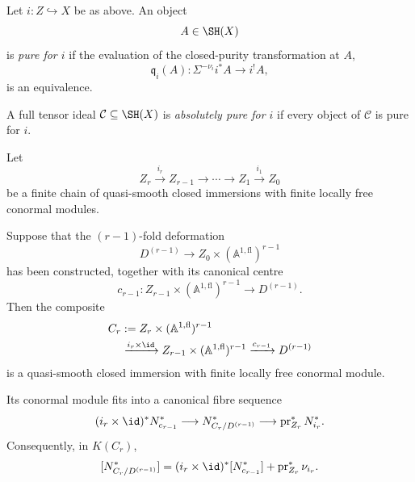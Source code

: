 \begin{definition}
\label{def:i-pure-object}
Let \(i:Z\hookrightarrow X\) be as above.  An object
\[
    A\in\SH(X)
\]
is \emph{pure for \(i\)} if the evaluation of the closed-purity
transformation at \(A\),
\[
    \mathfrak q_i(A):
    \Sigma^{-\nu_i}i^*A
    \longrightarrow
    i^!A,
\]
is an equivalence.

A full tensor ideal \(\mathcal C\subseteq\SH(X)\) is \emph{absolutely pure
for \(i\)} if every object of \(\mathcal C\) is pure for \(i\).
\end{definition}

\begin{lemma}
\label{lem:iterated-deformation-centres}
Let
\[
    Z_r\xrightarrow{i_r}Z_{r-1}
    \longrightarrow\cdots\longrightarrow
    Z_1\xrightarrow{i_1}Z_0
\]
be a finite chain of quasi-smooth closed immersions with finite locally free
conormal modules.

Suppose that the \((r-1)\)-fold deformation
\[
    D^{(r-1)}
    \longrightarrow
    Z_0\times
    (\mathbb A^{1,\mathrm{fl}})^{r-1}
\]
has been constructed, together with its canonical centre
\[
    c_{r-1}:
    Z_{r-1}\times
    (\mathbb A^{1,\mathrm{fl}})^{r-1}
    \longrightarrow
    D^{(r-1)}.
\]
Then the composite
\[
\begin{aligned}
    C_r
    &:=
    Z_r\times
    (\mathbb A^{1,\mathrm{fl}})^{r-1}
    \\
    &\xrightarrow{i_r\times\id}
    Z_{r-1}\times
    (\mathbb A^{1,\mathrm{fl}})^{r-1}
    \xrightarrow{c_{r-1}}
    D^{(r-1)}
\end{aligned}
\]
is a quasi-smooth closed immersion with finite locally free conormal
module.

Its conormal module fits into a canonical fibre sequence
\[
    (i_r\times\id)^*N^*_{c_{r-1}}
    \longrightarrow
    N^*_{C_r/D^{(r-1)}}
    \longrightarrow
    \operatorname{pr}_{Z_r}^*N^*_{i_r}.
\]
Consequently, in \(K(C_r)\),
\[
    [N^*_{C_r/D^{(r-1)}}]
    =
    (i_r\times\id)^*[N^*_{c_{r-1}}]
    +
    \operatorname{pr}_{Z_r}^*\nu_{i_r}.
\]
\end{lemma}

